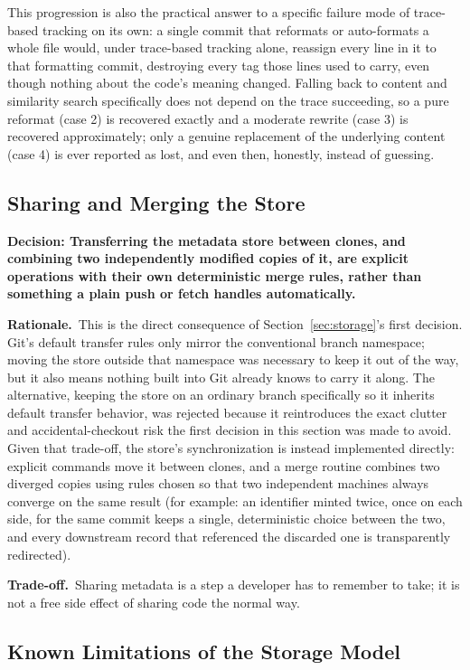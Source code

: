 \documentclass[11pt]{article}
\newcommand{\decision}[1]{\medskip\noindent\textbf{Decision: #1}\par\nopagebreak\smallskip}
\newcommand{\rationale}{\noindent\textbf{Rationale.}\ }
\newcommand{\tradeoff}{\noindent\textbf{Trade-off.}\ }
\begin{document}
This progression is also the practical answer to a specific failure mode
of trace-based tracking on its own: a single commit that reformats or
auto-formats a whole file would, under trace-based tracking alone,
reassign every line in it to that formatting commit, destroying every tag
those lines used to carry, even though nothing about the code's meaning
changed. Falling back to content and similarity search specifically does
not depend on the trace succeeding, so a pure reformat (case 2) is
recovered exactly and a moderate rewrite (case 3) is recovered
approximately; only a genuine replacement of the underlying content (case
4) is ever reported as lost, and even then, honestly, instead of guessing.

\subsection{Sharing and Merging the Store}
\label{sec:sharing}

\decision{Transferring the metadata store between clones, and combining
two independently modified copies of it, are explicit operations with
their own deterministic merge rules, rather than something a plain push
or fetch handles automatically.}

\rationale This is the direct consequence of Section~\ref{sec:storage}'s
first decision. Git's default transfer rules only mirror the conventional
branch namespace; moving the store outside that namespace was necessary to
keep it out of the way, but it also means nothing built into Git already
knows to carry it along. The alternative, keeping the store on an
ordinary branch specifically so it inherits default transfer behavior,
was rejected because it reintroduces the exact clutter and
accidental-checkout risk the first decision in this section was made to
avoid. Given that trade-off, the store's synchronization is instead
implemented directly: explicit commands move it between clones, and a
merge routine combines two diverged copies using rules chosen so that two
independent machines always converge on the same result (for example: an
identifier minted twice, once on each side, for the same commit keeps a
single, deterministic choice between the two, and every downstream record
that referenced the discarded one is transparently redirected).

\tradeoff Sharing metadata is a step a developer has to remember to take;
it is not a free side effect of sharing code the normal way.

\subsection{Known Limitations of the Storage Model}
\label{sec:storage-limits}
\end{document}

